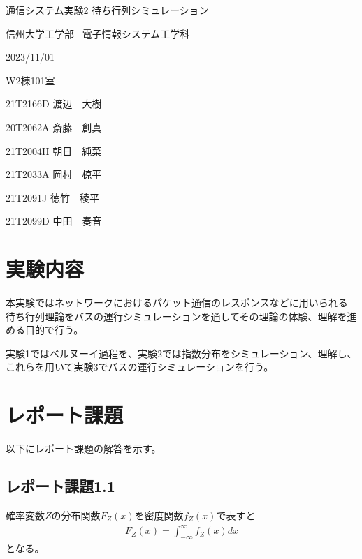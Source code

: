 \documentclass[a4paper,11pt,dvipdfmx]{jsarticle}
\begin{document}
\begin{titlepage}
\noindent
\vspace{6cm}
\begin{center}
\begin{LARGE}
通信システム実験2 待ち行列シミュレーション
\end{LARGE}
\end{center}
\vspace{6cm}
\begin{flushright}
信州大学工学部 \
電子情報システム工学科 \
\begin{description}
\setlength{\leftskip}{8.9cm}
\item[　　実験日:] 2023/11/01
\item[　実験場所:] W2棟101室
\item[　　実験者:] 21T2166D 渡辺　大樹
\item[共同実験者:] 20T2062A 斎藤　創真
\item[　　　　　 ] 21T2004H 朝日　純菜
\item[　　　　　 ] 21T2033A 岡村　椋平
\item[　　　　　 ] 21T2091J 徳竹　稜平
\item[　　　　　 ] 21T2099D 中田　奏音
\end{description}
\end{flushright}
\end{titlepage}



\section{実験内容}
本実験ではネットワークにおけるパケット通信のレスポンスなどに用いられる
待ち行列理論をバスの運行シミュレーションを通してその理論の体験、理解を進める目的で行う。

実験1ではベルヌーイ過程を、実験2では指数分布をシミュレーション、理解し、これらを用いて実験3でバスの運行シミュレーションを行う。

\section{レポート課題}
以下にレポート課題の解答を示す。

\subsection*{レポート課題1.1}
確率変数$Z$の分布関数$F_Z(x)$を密度関数$f_Z(x)$で表すと
\begin{align}
    F_Z(x) = \int_{-\infty}^{\infty}f_Z(x)dx
\end{align}
となる。
\end{document}
